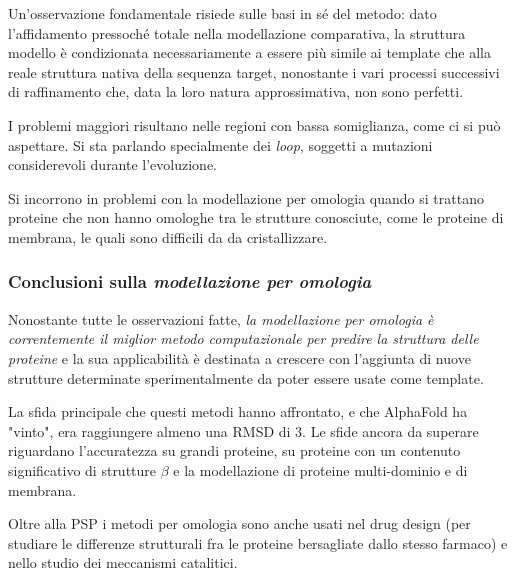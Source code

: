 {	\par Un'osservazione fondamentale risiede sulle basi in sé del metodo: dato l'affidamento pressoché totale nella modellazione comparativa, la struttura modello è condizionata necessariamente a essere più simile ai template che alla reale struttura nativa della sequenza target, nonostante i vari processi successivi di raffinamento che, data la loro natura approssimativa, non sono perfetti. 
	
	\par I problemi maggiori risultano nelle regioni con bassa somiglianza, come ci si può aspettare. Si sta parlando specialmente dei \textit{loop}, soggetti a mutazioni considerevoli durante l'evoluzione.
	
	\par Si incorrono in problemi con la modellazione per omologia quando si trattano proteine che non hanno omologhe tra le strutture conosciute, come le proteine di membrana, le quali sono difficili da da cristallizzare. \\
	
	\subsubsection{Conclusioni sulla \textit{modellazione per omologia}}
	
	\par Nonostante tutte le osservazioni fatte, \textit{la modellazione per omologia è correntemente il miglior metodo computazionale per predire la struttura delle proteine} e la sua applicabilità è destinata a crescere con l'aggiunta di nuove strutture determinate sperimentalmente da poter essere usate come template.
	
	\par La sfida principale che questi metodi hanno affrontato, e che AlphaFold ha "vinto", era raggiungere almeno una RMSD di 3\angstrom. Le sfide ancora da superare riguardano l'accuratezza su grandi proteine, su proteine con un contenuto significativo di strutture $\beta$ e la modellazione di proteine multi-dominio e di membrana.
	
	\par Oltre alla PSP i metodi per omologia sono anche usati nel drug design (per studiare le differenze strutturali fra le proteine bersagliate dallo stesso farmaco) e nello studio dei meccanismi catalitici.
	
}

